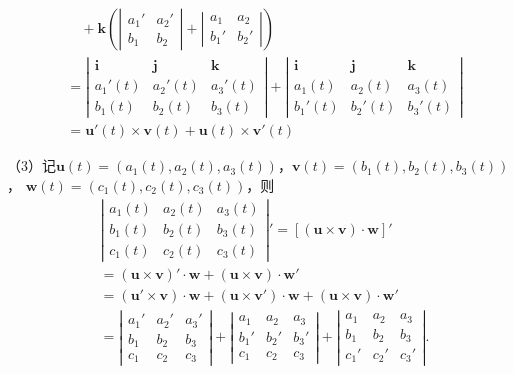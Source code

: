 \begin{align*}
    &\quad +\bm{k}\left(\left|\begin{array}{cc}
  	a_1' & a_2'\\
  	b_1 & b_2
    \end{array}\right|
    +\left|\begin{array}{cc}
  	a_1 & a_2\\
  	b_1' & b_2'
    \end{array}\right|\right)\\
    &=\left|\begin{array}{ccc}
	\bm{i} & \bm{j} & \bm{k}\\
  	a_1'(t) & a_2'(t) & a_3'(t)\\
  	b_1(t) & b_2(t) & b_3(t)
  	\end{array}\right|
  	+\left|\begin{array}{ccc}
	\bm{i} & \bm{j} & \bm{k}\\
  	a_1(t) & a_2(t) & a_3(t)\\
  	b_1'(t) & b_2'(t) & b_3'(t)
  	\end{array}\right|\\
  	&=\bm{u}'(t)\times\bm{v}(t)+\bm{u}(t)\times\bm{v}'(t)
\end{align*}

（3）记$\bm{u}(t)=(a_1(t),a_2(t),a_3(t))$，$\bm{v}(t)=(b_1(t),b_2(t),b_3(t))$，
$\bm{w}(t)=(c_1(t),c_2(t),c_3(t))$，则
\begin{align*}
	&\left|\begin{array}{ccc}
  	a_1(t) & a_2(t) & a_3(t)\\
  	b_1(t) & b_2(t) & b_3(t)\\
  	c_1(t) & c_2(t) & c_3(t)
  \end{array}\right|'
  =[(\bm{u}\times\bm{v})\cdot\bm{w}]'\\
  &=(\bm{u}\times\bm{v})'\cdot\bm{w}+(\bm{u}\times\bm{v})\cdot\bm{w}'\\
  &=(\bm{u}'\times\bm{v})\cdot\bm{w}+(\bm{u}\times\bm{v}')\cdot\bm{w}
  +(\bm{u}\times\bm{v})\cdot\bm{w}'\\
  &=\left|\begin{array}{ccc}
  	a_1' & a_2' & a_3'\\
  	b_1 & b_2 & b_3\\
  	c_1 & c_2 & c_3
  \end{array}\right|
  +\left|\begin{array}{ccc}
  	a_1 & a_2 & a_3\\
  	b_1' & b_2' & b_3'\\
  	c_1 & c_2 & c_3
  \end{array}\right|
  +\left|\begin{array}{ccc}
  	a_1 & a_2 & a_3\\
  	b_1 & b_2 & b_3\\
  	c_1' & c_2' & c_3'
  \end{array}\right|.
\end{align*}
\fin

